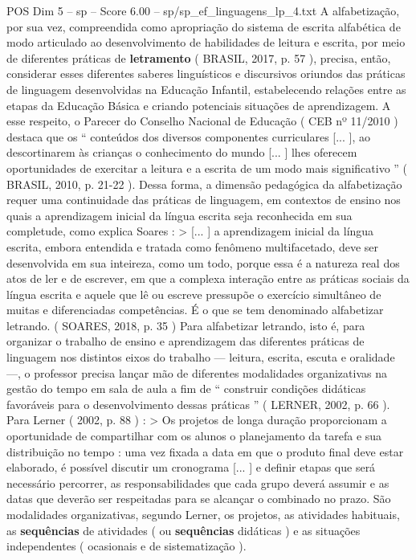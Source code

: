 \begin{textsample}{POS Dim 5 – sp – Score 6.00 – sp/sp\_ef\_linguagens\_lp\_4.txt}
A alfabetização, por sua vez, compreendida como apropriação do sistema de escrita alfabética de modo articulado ao desenvolvimento de habilidades de leitura e escrita, por meio de diferentes práticas de \textbf{letramento} ( BRASIL, 2017, p. 57 ), precisa, então, considerar esses diferentes saberes linguísticos e discursivos oriundos das práticas de linguagem desenvolvidas na Educação Infantil, estabelecendo relações entre as etapas da Educação Básica e criando potenciais situações de aprendizagem.
A esse respeito, o Parecer do Conselho Nacional de Educação ( CEB nº 11/2010 ) destaca que os “ conteúdos dos diversos componentes curriculares [... ], ao descortinarem às crianças o conhecimento do mundo [... ] lhes oferecem oportunidades de exercitar a leitura e a escrita de um modo mais significativo ” ( BRASIL, 2010, p. 21-22 ).
Dessa forma, a dimensão pedagógica da alfabetização requer uma continuidade das práticas de linguagem, em contextos de ensino nos quais a aprendizagem inicial da língua escrita seja reconhecida em sua completude, como explica Soares : > [... ] a aprendizagem inicial da língua escrita, embora entendida e tratada como fenômeno multifacetado, deve ser desenvolvida em sua inteireza, como um todo, porque essa é a natureza real dos atos de ler e de escrever, em que a complexa interação entre as práticas sociais da língua escrita e aquele que lê ou escreve pressupõe o exercício simultâneo de muitas e diferenciadas competências.
É o que se tem denominado alfabetizar letrando. ( SOARES, 2018, p. 35 ) Para alfabetizar letrando, isto é, para organizar o trabalho de ensino e aprendizagem das diferentes práticas de linguagem nos distintos eixos do trabalho — leitura, escrita, escuta e oralidade —, o professor precisa lançar mão de diferentes modalidades organizativas na gestão do tempo em sala de aula a fim de “ construir condições didáticas favoráveis para o desenvolvimento dessas práticas ” ( LERNER, 2002, p. 66 ).
Para Lerner ( 2002, p. 88 ) : > Os projetos de longa duração proporcionam a oportunidade de compartilhar com os alunos o planejamento da tarefa e sua distribuição no tempo : uma vez fixada a data em que o produto final deve estar elaborado, é possível discutir um cronograma [... ] e definir etapas que será necessário percorrer, as responsabilidades que cada grupo deverá assumir e as datas que deverão ser respeitadas para se alcançar o combinado no prazo.
São modalidades organizativas, segundo Lerner, os projetos, as atividades habituais, as \textbf{sequências} de atividades ( ou \textbf{sequências} didáticas ) e as situações independentes ( ocasionais e de sistematização ).

\end{textsample}
